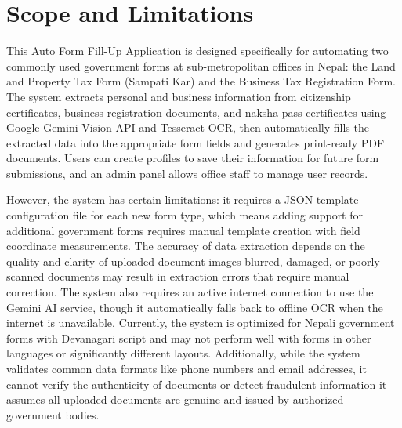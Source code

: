 \documentclass[12pt]{report}
\begin{document}
\section{Scope and Limitations}
This Auto Form Fill-Up Application is designed specifically for automating two commonly used government forms at sub-metropolitan offices in Nepal: the Land and Property Tax Form (Sampati Kar) and the Business Tax Registration Form. The system extracts personal and business information from citizenship certificates, business registration documents, and naksha pass certificates using Google Gemini Vision API and Tesseract OCR, then automatically fills the extracted data into the appropriate form fields and generates print-ready PDF documents. Users can create profiles to save their information for future form submissions, and an admin panel allows office staff to manage user records. 

However, the system has certain limitations: it requires 
a JSON template configuration file for each new form type, which means adding support for additional government forms requires manual template creation with field coordinate measurements. The accuracy of data extraction depends on the quality and clarity of uploaded document images blurred, damaged, or poorly scanned documents may result in extraction errors that require manual correction. The system also requires an active internet connection to use the Gemini AI service, though it automatically falls back to offline OCR when the internet is unavailable. Currently, the system is optimized for Nepali government forms with Devanagari script and may not perform well with forms in other languages or significantly different layouts. Additionally, while the system validates common data formats like phone numbers and email addresses, it cannot verify the authenticity of documents or detect fraudulent information it assumes all uploaded documents are genuine and issued by authorized government bodies.

\newpage
\end{document}
